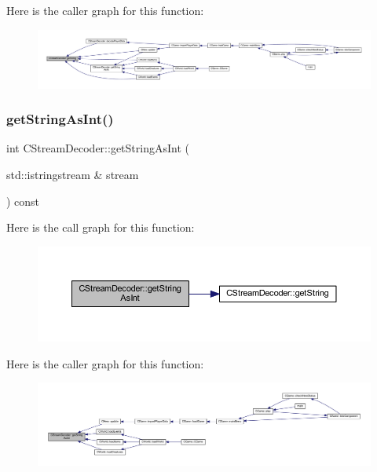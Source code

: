 Here is the caller graph for this function\+:\nopagebreak
\begin{figure}[H]
\begin{center}
\leavevmode
\includegraphics[width=350pt]{class_c_stream_decoder_a736a4660fb1fc91ffc7345050f815994_icgraph}
\end{center}
\end{figure}
\mbox{\label{class_c_stream_decoder_aeaef1aa3239cf7b5d00397b6e46f67d1}} 
\subsubsection{\texorpdfstring{get\+String\+As\+Int()}{getStringAsInt()}}
{\footnotesize\ttfamily int C\+Stream\+Decoder\+::get\+String\+As\+Int (\begin{DoxyParamCaption}\item[{std\+::istringstream \&}]{stream }\end{DoxyParamCaption}) const}

Here is the call graph for this function\+:\nopagebreak
\begin{figure}[H]
\begin{center}
\leavevmode
\includegraphics[width=350pt]{class_c_stream_decoder_aeaef1aa3239cf7b5d00397b6e46f67d1_cgraph}
\end{center}
\end{figure}
Here is the caller graph for this function\+:\nopagebreak
\begin{figure}[H]
\begin{center}
\leavevmode
\includegraphics[width=350pt]{class_c_stream_decoder_aeaef1aa3239cf7b5d00397b6e46f67d1_icgraph}
\end{center}
\end{figure}
\mbox{\label{class_c_stream_decoder_a4ddd62e9d414ff656f5708e3c0c39b36}} 
